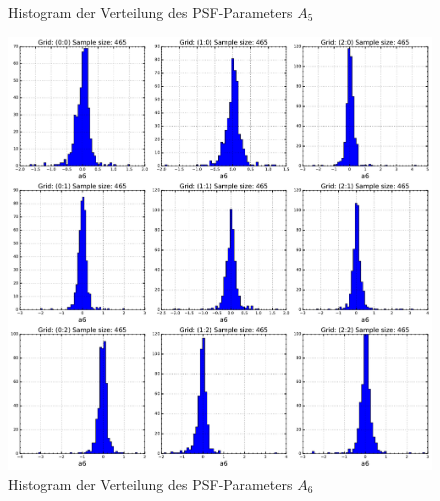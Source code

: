 \begin{appendix}
\begin{figure}[H]
	\caption[Histogram der Verteilung des PSF-Parameters $A_5$]{Histogram der Verteilung des PSF-Parameters $A_5$}
    \label{psf_dist_a5}
\end{figure}
\begin{figure}[H]
	\centering
	\includegraphics[scale=.42]{psf_dist/a6.pdf}
	\caption[Histogram der Verteilung des PSF-Parameters $A_6$]{Histogram der Verteilung des PSF-Parameters $A_6$}
    \label{psf_dist_a6}
\end{figure}


\end{appendix}
